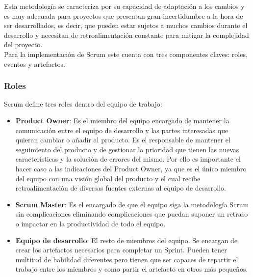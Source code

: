 Esta metodología se caracteriza por su capacidad de adaptación a los cambios y es muy adecuada para proyectos que presentan gran incertidumbre a la hora de ser desarrollados, es decir, que pueden estar sujetos a muchos cambios durante el desarrollo y necesitan de retroalimentación constante para mitigar la complejidad del proyecto.
\\

Para la implementación de Scrum este cuenta con tres componentes claves: roles, eventos y artefactos.

\subsubsection{Roles}
Scrum define tres roles dentro del equipo de trabajo:
\begin{itemize}
	\item \textbf{Product Owner}: Es el miembro del equipo encargado de mantener la comunicación entre el equipo de desarrollo y las partes interesadas que quieran cambiar o añadir al producto. Es el responsable de mantener el seguimiento del producto y de gestionar la prioridad que tienen las nuevas características y la solución de errores del mismo. Por ello es importante el hacer caso a las indicaciones del Product Owner, ya que es el único miembro del equipo con una visión global del producto y el cual recibe retroalimentación de diversas fuentes externas al equipo de desarrollo.
	\item \textbf{Scrum Master}: Es el encargado de que el equipo siga la metodología Scrum sin complicaciones eliminando complicaciones que puedan suponer un retraso o impactar en la productividad de todo el equipo.
	\item \textbf{Equipo de desarrollo}: El resto de miembros del equipo. Se encargan de crear los artefactos necesarios para completar un Sprint. Pueden tener multitud de habilidad diferentes pero tienen que ser capaces de repartir el trabajo entre los miembros y como partir el artefacto en otros más pequeños.
\end{itemize}

